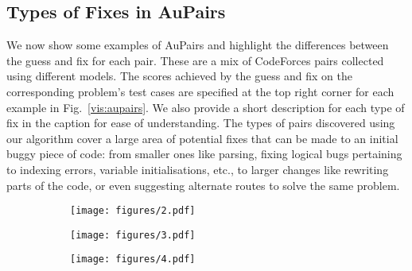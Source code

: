 \documentclass[11pt, a4paper, logo, copyright]{googledeepmind}
\def\aupairs/{\textcolor{golden}{Au}Pairs}
\begin{document}
\subsection{Types of Fixes in \aupairs/}\label{sec:actual_aupairs}

We now show some examples of \aupairs/ and highlight the differences between the guess and fix for each pair. These are a mix of CodeForces pairs collected using different models. The scores achieved by the guess and fix on the corresponding problem's test cases are specified at the top right corner for each example in Fig.~\ref{vis:aupairs}. We also provide a short description for each type of fix in the caption for ease of understanding. The types of pairs discovered using our algorithm cover a large area of potential fixes that can be made to an initial buggy piece of code: from smaller ones like parsing, fixing logical bugs pertaining to indexing errors, variable initialisations, etc., to larger changes like rewriting parts of the code, or even suggesting alternate routes to solve the same problem.


\begin{figure}[!b]
    \centering

    \begin{subfigure}{\linewidth}
    \texttt{[image: figures/2.pdf]}
    \end{subfigure}
    \medskip
    
    \begin{subfigure}{\linewidth}
    \texttt{[image: figures/3.pdf]}
    \end{subfigure}
    \medskip
    
    \begin{subfigure}{\linewidth}
    \texttt{[image: figures/4.pdf]}
    \end{subfigure}
    \medskip
\end{figure}
\end{document}
